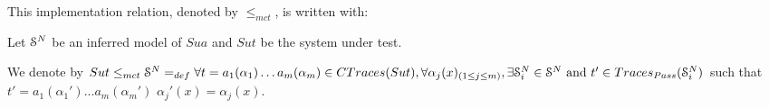 
%
%

This implementation relation, denoted by $\leq_{mct}$, is
written with:

\begin{definition}
	\label{impl21}
	 Let $\EuScript{S}^{N}$ be an inferred model of $\mathit{Sua}$ and
	 $\mathit{Sut}$ be the system under test.

     We denote by ${Sut} \leq_{mct} \EuScript{S}^{N} =_{def} \forall
     t= a_1(\alpha_1) \dots a_m(\alpha_m) \in CTraces({Sut}),
     \forall \alpha_j(x)_{(1 \leq j \leq m)},\\ \exists
     \EuScript{S}_i^{N} \in \EuScript{S}^{N} \text{ and } t'\in
     Traces_{Pass}(\EuScript{S}_i^{N})$ such that
     $t'=a_1(\alpha_1')...a_m(\alpha_m')$ 
     $\alpha_j'(x)=\alpha_j(x)$.
\end{definition}


